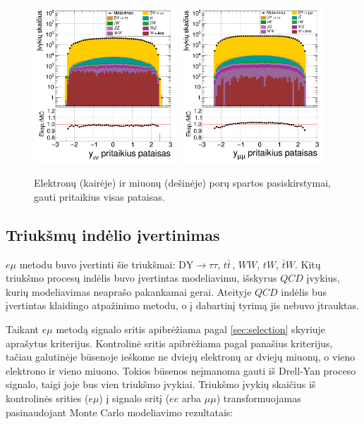 \documentclass[a4paper, 12pt, twoside]{article}
\newcommand{\emu}{e\mu}
\newcommand{\DYtau}{\mathrm{DY} \! \rightarrow \! \tau\tau}
\begin{document}
\begin{figure}[H]
	\includegraphics[width=0.48\textwidth]{ee_rapi_after.png}
	\includegraphics[width=0.48\textwidth]{mumu_rapi_after.png}
	\caption{\label{fig:rapia} Elektronų (kairėje) ir miuonų (dešinėje) porų spartos pasiskirstymai,
		gauti pritaikius visas pataisas.}
\end{figure}

\subsection{Triukšmų indėlio įvertinimas}\label{sec:SignalBkg}

$\emu$ metodu buvo įvertinti šie triukšmai: $\DYtau$, $t\bar{t}\,$, $WW$, $tW$, $\bar{t}W$.
Kitų triukšmo procesų indėlis buvo įvertintas modeliavimu, išskyrus $QCD$ įvykius, kurių modeliavimas neaprašo pakankamai
gerai.
Ateityje $QCD$ indėlis bus įvertintas klaidingo atpažinimo metodu, o į dabartinį tyrimą jis nebuvo įtrauktas.

Taikant $\emu$ metodą signalo sritis apibrėžiama pagal \ref{sec:selection} skyriuje aprašytus kriterijus.
Kontrolinė sritis apibrėžiama pagal panašius kriterijus, tačiau galutinėje būsenoje ieškome
ne dviejų elektronų ar dviejų miuonų, o vieno elektrono ir vieno miuono.
Tokios būsenos neįmanoma gauti iš Drell-Yan proceso signalo, taigi joje bus vien triukšmo įvykiai.
Triukšmo įvykių skaičius iš kontrolinės srities ($\emu$) į signalo sritį ($ee$ arba $\mu\mu$)
transformuojamas pasinaudojant Monte Carlo modeliavimo rezultatais:
\end{document}
